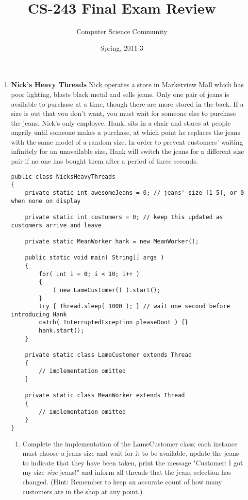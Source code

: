 \documentclass[11pt]{article}
\author{Computer Science Community}
\title{CS-243 Final Exam Review}
\date{Spring, 2011-3}
\begin{document}
\header

\begin{enumerate}

\item {\bf Nick's Heavy Threads} Nick operates a store in Marketview Mall which
      has poor lighting, blasts black metal and sells jeans. Only one pair of
      jeans is available to purchase at a time, though there are more
      stored in the back. If a size is out that you don't want, you must
      wait for someone else to purchase the jeans. Nick's only employee, Hank,
      sits in a chair and stares at people angrily until someone makes a
      purchase, at which point he replaces the jeans with the same model of a random
      size. In order to prevent customers' waiting infinitely for an unavailable
      size, Hank will switch the jeans for a different size pair if no one has
      bought them after a period of three seconds.
    
\begin{lstlisting}
public class NicksHeavyThreads
{
    private static int awesomeJeans = 0; // jeans' size [1-5], or 0 when none on display
    
    private static int customers = 0; // keep this updated as customers arrive and leave
    
    private static MeanWorker hank = new MeanWorker();
    
    public static void main( String[] args )
    {
        for( int i = 0; i < 10; i++ )
        {
            ( new LameCustomer() ).start();
        }
        try { Thread.sleep( 1000 ); } // wait one second before introducing Hank
        catch( InterruptedException pleaseDont ) {}
        hank.start();
    }
    
    private static class LameCustomer extends Thread
    {
        // implementation omitted
    }
    
    private static class MeanWorker extends Thread
    {
        // implementation omitted
    }
}
\end{lstlisting}

    \begin{enumerate}
    
    \item Complete the implementation of the LameCustomer class; each instance must
          choose a jeans size and wait for it to be available, update the jeans to
          indicate that they have been taken, print the message
          "Customer: I got my size \emph{size} jeans!" and inform all threads that
          the jeans selection has changed.
          (Hint: Remember to keep an accurate count of how many customers are in
          the shop at any point.)


\end{enumerate}
\end{enumerate}
\end{document}
